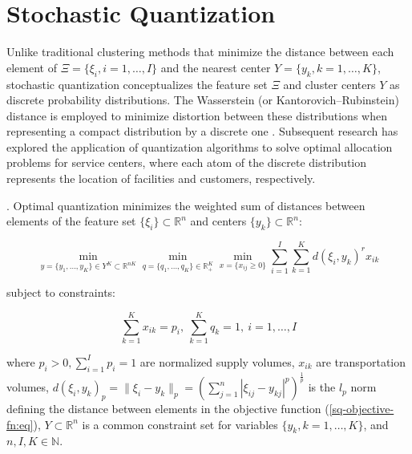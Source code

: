 \section{Stochastic Quantization}

Unlike traditional clustering methods that minimize the distance between each element of $\Xi = \{\xi_i, i = 1, \ldots, I\}$ and the nearest center $Y = \{y_k, k = 1, \ldots, K\}$, stochastic quantization conceptualizes the feature set $\Xi$ and cluster centers $Y$ as discrete probability distributions. The Wasserstein (or Kantorovich–Rubinstein) distance is employed to minimize distortion between these distributions when representing a compact distribution by a discrete one \cite{Kuzmenko_Uryasev_2019,Lakshmanan_Pichler_2023}. Subsequent research \cite{Kuzmenko_Uryasev_2019,Norkin_Onishchenko_2005} has explored the application of quantization algorithms to solve optimal allocation problems for service centers, where each atom of the discrete distribution represents the location of facilities and customers, respectively.

\begin{definition}
    \label{Stochastic Quantization} \cite{Kuzmenko_Uryasev_2019}. Optimal quantization minimizes the weighted sum of distances between elements of the feature set $\{\xi_i\} \subset \mathbb{R}^{n}$ and centers $\{y_k\} \subset \mathbb{R}^{n}$:

    \begin{equation}
        \label{sq-objective-fn:eq}
            \min_{y = \{ y_1, \ldots, y_K \} \in Y^K \subset \mathbb{R}^{nK}} \min_{q = \{ q_1, \ldots, q_K \} \in \mathbb{R}^K_{+}} \min_{x = \{ x_{ij} \geq 0 \}} \sum_{i=1}^I \sum_{k=1}^K d(\xi_i, y_k)^r x_{ik}
    \end{equation}

    subject to constraints:

    \begin{equation}
        \label{sq-objective-constraints:eq}
            \sum_{k=1}^K x_{ik} = p_i, \> \sum_{k=1}^K q_k = 1, \> i = 1, \ldots, I
    \end{equation}

    \noindent where $p_i > 0, \sum_{i=1}^I p_i = 1$ are normalized supply volumes, $x_{ik}$ are transportation volumes, $ d(\xi_i, y_k)_p = \| \xi_i - y_k \|_p = (\sum_{j=1}^n | \xi_{ij} - y_{kj} |^p)^{\frac{1}{p}} $ is the $l_p$ norm defining the distance between elements in the objective function (\ref{sq-objective-fn:eq}), $Y \subset \mathbb{R}^{n}$ is a common constraint set for variables $\{y_k, k = 1, \ldots, K\}$, and $n, I, K \in \mathbb{N}$.
\end{definition}

